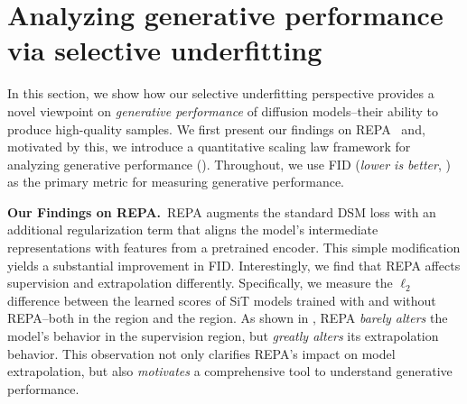 \section{Analyzing generative performance via selective underfitting} \label{sec:performance}
\neuripsonly{\vspace{-0.5\baselineskip}}
In this section, we show how our selective underfitting perspective provides a novel viewpoint on \emph{generative performance} of diffusion models--their ability to produce high-quality samples. We first present our findings on REPA~\citep{yu2024representation} and, motivated by this, we introduce a quantitative scaling law framework for analyzing generative performance (). Throughout, we use FID (\emph{lower is better}, \cite{heusel2017gans}) as the primary metric for measuring generative performance.

\begin{minipage}{0.645\textwidth}
\textbf{Our Findings on REPA.}~REPA augments the standard DSM loss with an additional regularization term that aligns the model's intermediate representations with features from a pretrained encoder. This simple modification yields a substantial improvement in FID. Interestingly, we find that REPA affects supervision and extrapolation differently. Specifically, we measure the $\ell_2$ difference between the learned scores of SiT models trained with and without REPA--both in the  region and the  region. As shown in , REPA \emph{barely alters} the model's behavior in the supervision region, but \emph{greatly alters} its extrapolation behavior. This observation not only clarifies REPA's impact on model extrapolation, but also \emph{motivates} a comprehensive tool to understand generative performance.
\end{minipage}
\hfill
\begin{minipage}{0.34\textwidth}
    
\end{minipage}



